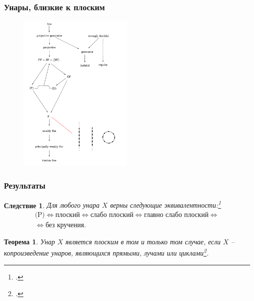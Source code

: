 \documentclass[11pt, notheorems]{beamer}
\newtheorem{theorem}{Теорема}
\newtheorem{corollary}{Следствие}
\begin{document}
\begin{frame}
	\frametitle{Унары, близкие к плоским}

	\begin{figure}
		\center
		\includegraphics[width=0.5\textwidth]{overview_2.png}
	\end{figure}
\end{frame}

\begin{frame}
	\frametitle{Результаты}

	\begin{corollary}
		Для любого унара $X$ верны следующие эквивалентности:\footcite[следствие 3]{pryan:unars_close_to_flat}
		\begin{multline*}
			\text{(P)} \Leftrightarrow \text{плоский} \Leftrightarrow \text{слабо плоский} \Leftrightarrow \text{главно слабо плоский} \Leftrightarrow \\
			\Leftrightarrow \text{без кручения}.
		\end{multline*}
	\end{corollary}

	\begin{theorem}
		Унар $X$ является плоским в том и только том случае, если $X$ -- копроизведение унаров, являющихся прямыми, лучами или циклами\footcite[теорема]{flat_unars}.
	\end{theorem}
\end{frame}
\end{document}
